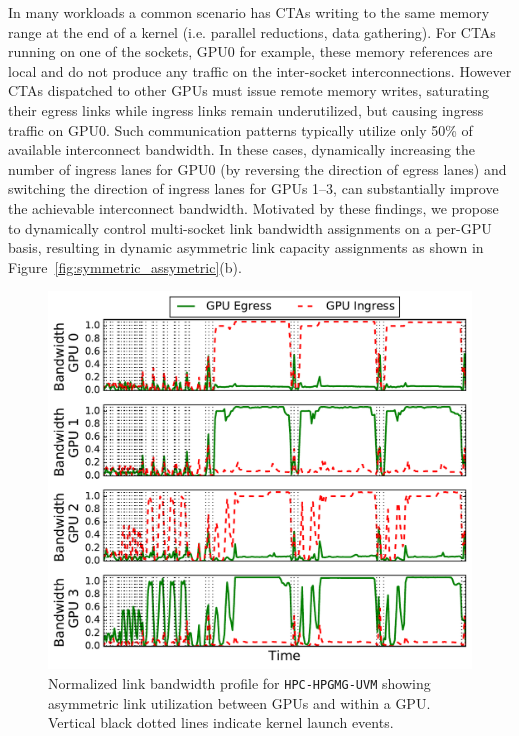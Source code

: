 In many workloads a common
scenario has CTAs writing to the same memory range at the end of a
kernel (i.e. parallel reductions, data gathering). For CTAs running on one of the
sockets, GPU0 for example, these memory references are local and do not
produce any traffic on the inter-socket interconnections. However CTAs dispatched
to other GPUs must issue remote memory writes, saturating their egress links while
ingress links remain underutilized, but causing ingress traffic on GPU0. 
Such communication patterns typically utilize only
50\% of available interconnect bandwidth. In these cases, dynamically increasing the 
number of ingress lanes for GPU0
(by reversing the direction of egress lanes) and switching the direction of
ingress lanes for GPUs 1--3, can substantially improve the achievable interconnect
bandwidth. Motivated by these findings, we propose to dynamically control multi-socket
link bandwidth assignments on a per-GPU basis, resulting in
dynamic asymmetric link capacity assignments as shown in
Figure~\ref{fig:symmetric_assymetric}(b).  

\begin{figure}[t]
	\centering
	\includegraphics[width=1.0\columnwidth]{figures/bw_profile_HPGMG_UVM_base.pdf}
	\caption{Normalized link bandwidth profile for \texttt{HPC-HPGMG-UVM} 
		showing asymmetric link utilization between GPUs and within a GPU. Vertical black 
		dotted lines indicate kernel launch events.}
	\label{fig:link-motivation}
\end{figure}

